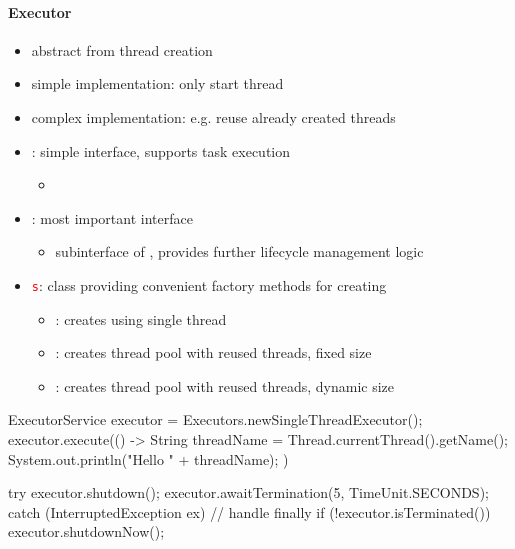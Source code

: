 \paragraph{Executor}
\begin{itemize}
  \item abstract from thread creation
  \item simple implementation: only start thread
  \item complex implementation: e.g. reuse already created threads
  \item {}: simple interface, supports task execution
  \begin{itemize}
    \item {}
  \end{itemize}
  \item {}: most important interface
  \begin{itemize}
    \item subinterface of , provides further lifecycle management logic
  \end{itemize}
  \item {}\textcolor{red}{\footnotesize\texttt{s}}: class providing convenient factory methods for creating 
  \begin{itemize}
    \item {}: creates  using single thread
    \item {}: creates thread pool with reused threads, fixed size
    \item {}: creates thread pool with reused threads, dynamic size
  \end{itemize}
\end{itemize}
\begin{java}
  ExecutorService executor = Executors.newSingleThreadExecutor();
  executor.execute(() -> {
    String threadName = Thread.currentThread().getName();
    System.out.println("Hello " + threadName);
  })

  try {
    executor.shutdown();
    executor.awaitTermination(5, TimeUnit.SECONDS);
  } catch (InterruptedException ex) {
    // handle
  } finally {
    if (!executor.isTerminated()) {
      executor.shutdownNow();
    }
  }
\end{java}

